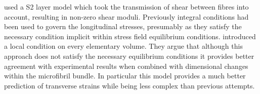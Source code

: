 \cite{Guitard_1999} used a S2 layer model which took the transmission of shear
between fibres into account, resulting in non-zero shear moduli. Previously
integral conditions had been used to govern the longitudinal stresses,
presumably as they satisfy the necessary condition implicit within stress field
equilibrium conditions. \cite{Guitard_1999} introduced a local condition on
every elementary volume. They argue that although this approach does not satisfy
the necessary equilibrium conditions it provides better agreement with
experimental results when combined with dimensional changes within the
microfibril bundle. In particular this model provides a much better prediction
of transverse strains while being less complex than previous attempts.